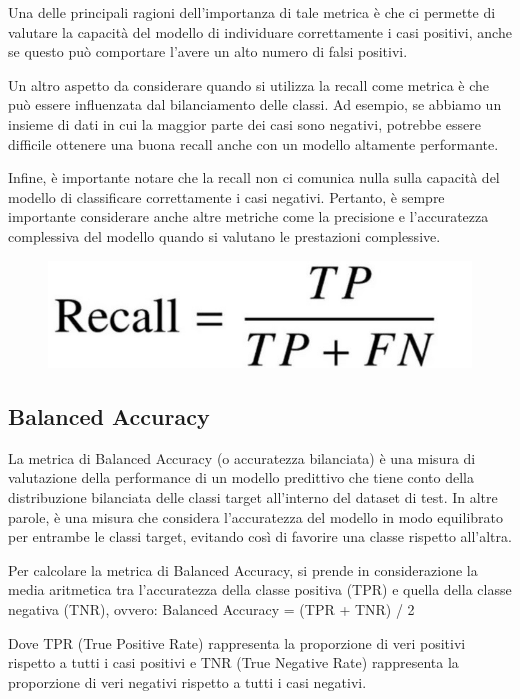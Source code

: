 Una delle principali ragioni dell’importanza di tale metrica è che ci permette di valutare la capacità del modello di individuare correttamente i casi positivi, anche se questo può comportare l’avere un alto numero di falsi positivi.

Un altro aspetto da considerare quando si utilizza la recall come metrica è che può essere influenzata dal bilanciamento delle classi. Ad esempio, se abbiamo un insieme di dati in cui la maggior parte dei casi sono negativi, potrebbe essere difficile ottenere una buona recall anche con un modello altamente performante.

Infine, è importante notare che la recall non ci comunica nulla sulla capacità del modello di classificare correttamente i casi negativi. Pertanto, è sempre importante considerare anche altre metriche come la precisione e l'accuratezza complessiva del modello quando si valutano le prestazioni complessive.

\begin{figure}
    \begin{center}    
        \includegraphics[width=0.9\linewidth]{images/image49.jpeg}
    \end{center}
\end{figure}

\subsection{Balanced Accuracy}
La metrica di Balanced Accuracy (o accuratezza bilanciata) è una misura di valutazione della performance di un modello predittivo che tiene conto della distribuzione bilanciata delle classi target all'interno del dataset di test. In altre parole, è una misura che considera l'accuratezza del modello in modo equilibrato per entrambe le classi target, evitando così di favorire una classe rispetto all'altra.

Per calcolare la metrica di Balanced Accuracy, si prende in considerazione la media aritmetica tra l'accuratezza della classe positiva (TPR) e quella della classe negativa (TNR), ovvero:
Balanced Accuracy = (TPR + TNR) / 2
 
Dove TPR (True Positive Rate) rappresenta la proporzione di veri positivi rispetto a tutti i casi positivi e TNR (True Negative Rate) rappresenta la proporzione di veri negativi rispetto a tutti i casi negativi.

